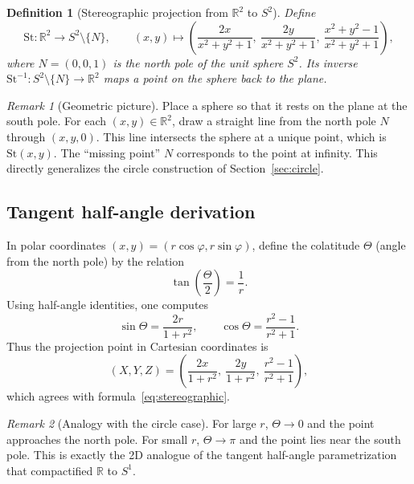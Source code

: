 \documentclass[12pt]{article}
\newtheorem{definition}{Definition}
\theoremstyle{remark}
\newtheorem*{remark}{Remark}
\begin{document}
\begin{definition}[Stereographic projection from $\mathbb{R}^2$ to $S^2$]
Define 
\begin{equation}\label{eq:stereographic}
\mathrm{St}:\mathbb{R}^2 \to S^2\setminus\{N\}, \qquad
(x,y)\mapsto \left(\frac{2x}{x^2+y^2+1},\ \frac{2y}{x^2+y^2+1},\ \frac{x^2+y^2-1}{x^2+y^2+1}\right),
\end{equation}
where $N=(0,0,1)$ is the north pole of the unit sphere $S^2$. Its inverse 
$\mathrm{St}^{-1}:S^2\setminus\{N\}\to\mathbb{R}^2$ maps a point on the sphere 
back to the plane.
\end{definition}

\begin{remark}[Geometric picture]
Place a sphere so that it rests on the plane at the south pole. For each 
$(x,y)\in\mathbb{R}^2$, draw a straight line from the north pole $N$ through 
$(x,y,0)$. This line intersects the sphere at a unique point, which is 
$\mathrm{St}(x,y)$. The “missing point” $N$ corresponds to the point at infinity.  
This directly generalizes the circle construction of Section~\ref{sec:circle}.
\end{remark}

\subsection{Tangent half-angle derivation}

In polar coordinates $(x,y) = (r\cos\varphi,r\sin\varphi)$, define the colatitude 
$\Theta$ (angle from the north pole) by the relation
\[
\tan\!\left(\frac{\Theta}{2}\right) = \frac{1}{r}.
\]
Using half-angle identities, one computes
\[
\sin\Theta = \frac{2r}{1+r^2}, \qquad \cos\Theta = \frac{r^2-1}{r^2+1}.
\]
Thus the projection point in Cartesian coordinates is
\begin{equation}
(X,Y,Z) = \left(\frac{2x}{1+r^2},\ \frac{2y}{1+r^2},\ \frac{r^2-1}{r^2+1}\right),
\end{equation}
which agrees with formula~\eqref{eq:stereographic}.  

\begin{remark}[Analogy with the circle case]
For large $r$, $\Theta \to 0$ and the point approaches the north pole.  
For small $r$, $\Theta \to \pi$ and the point lies near the south pole.  
This is exactly the 2D analogue of the tangent half-angle parametrization 
that compactified $\mathbb{R}$ to $S^1$.  
\end{remark}
\end{document}
